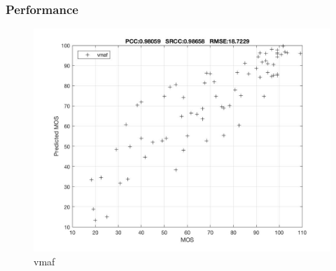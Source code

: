 \documentclass{beamer}
\begin{document}
\begin{frame}
\frametitle{Performance}
\begin{figure}
	\includegraphics[scale=0.2]{images/vmaf_testResult} 
	\centering
	\caption{vmaf}
\end{figure}
\end{frame} 
\end{document}
